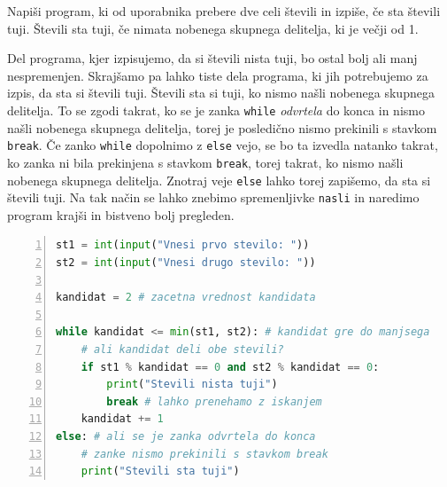 \begin{zgled}
Napiši program, ki od uporabnika prebere dve celi števili in izpiše, če sta števili tuji. Števili sta tuji, če nimata nobenega skupnega delitelja, ki je večji od 1.
\end{zgled}
\begin{resitev}
Del programa, kjer izpisujemo, da si števili nista tuji, bo ostal bolj ali manj nespremenjen. Skrajšamo pa lahko tiste dela programa, ki jih potrebujemo za izpis, da sta si števili tuji. Števili sta si tuji, ko nismo našli nobenega skupnega delitelja. To se zgodi takrat, ko se je zanka \texttt{while} \emph{odvrtela} do konca in nismo našli nobenega skupnega delitelja, torej je posledično nismo prekinili s stavkom \texttt{break}. Če zanko \texttt{while} dopolnimo z \texttt{else} vejo, se bo ta izvedla natanko takrat, ko zanka ni bila prekinjena s stavkom \texttt{break}, torej takrat, ko nismo našli nobenega skupnega delitelja. Znotraj veje \texttt{else} lahko torej zapišemo, da sta si števili tuji. Na tak način se lahko znebimo spremenljivke \texttt{nasli} in naredimo program krajši in bistveno bolj pregleden.
\begin{lstlisting}[language=Python,numbers=left]
st1 = int(input("Vnesi prvo stevilo: "))
st2 = int(input("Vnesi drugo stevilo: "))

kandidat = 2 # zacetna vrednost kandidata

while kandidat <= min(st1, st2): # kandidat gre do manjsega
    # ali kandidat deli obe stevili?
    if st1 % kandidat == 0 and st2 % kandidat == 0:
        print("Stevili nista tuji")
        break # lahko prenehamo z iskanjem
    kandidat += 1 
else: # ali se je zanka odvrtela do konca
    # zanke nismo prekinili s stavkom break
    print("Stevili sta tuji")
\end{lstlisting}
\end{resitev}